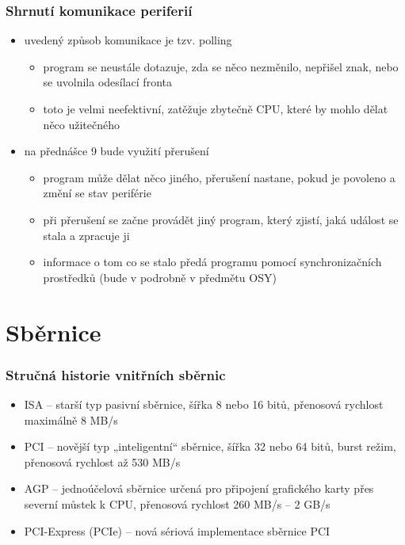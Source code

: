 \documentclass{beamer}
\begin{document}
\begin{frame}
\frametitle{Shrnutí komunikace periferií}

\begin{itemize}
\item uvedený způsob komunikace je tzv. polling
\begin{itemize}
\item program se neustále dotazuje, zda se něco nezměnilo, nepřišel znak, nebo se uvolnila odesílací fronta
\item toto je velmi neefektivní, zatěžuje zbytečně CPU, které by mohlo dělat něco užitečného
\end{itemize}
\item na přednášce 9 bude využití přerušení
\begin{itemize}
\item program může dělat něco jiného, přerušení nastane, pokud je povoleno a změní se stav periférie
\item při přerušení se začne provádět jiný program, který zjistí, jaká událost se stala a zpracuje ji
\item informace o tom co se stalo předá programu pomocí synchronizačních prostředků (bude v podrobně v předmětu OSY)
\end{itemize}
\end{itemize}

\end{frame}



\section{Sběrnice}

\begin{frame}
\frametitle{Stručná historie vnitřních sběrnic}

\begin{itemize}
\item ISA – starší typ pasivní sběrnice, šířka 8 nebo 16 bitů, přenosová rychlost maximálně 8 MB/s
\item PCI – novější typ „inteligentní“ sběrnice, šířka 32 nebo 64 bitů, burst režim, přenosová rychlost až 530 MB/s
\item AGP – jednoúčelová sběrnice určená pro připojení grafického karty přes severní můstek k CPU, přenosová rychlost 260 MB/s – 2 GB/s
\item PCI-Express (PCIe) – nová sériová implementace sběrnice PCI
\end{itemize}
\end{frame}
\end{document}
